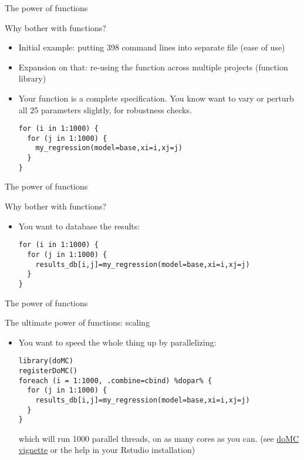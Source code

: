 \documentclass[xcolor=table,compress]{beamer}
\begin{document}
\begin{frame}[fragile]{The power of functions}
\begin{block}{Why bother with functions?}
\begin{itemize}
\item Initial example: putting 398 command lines into separate file (ease of use)
\item Expansion on that: re-using the function across multiple projects (function library)
\item Your function is a complete specification. You know want to vary or perturb all 25 parameters slightly, for robustness checks.
\begin{lstlisting}
for (i in 1:1000) {
  for (j in 1:1000) {
  	my_regression(model=base,xi=i,xj=j)
  }
}
\end{lstlisting}
\end{itemize}
\end{block}
\end{frame}




\begin{frame}[fragile]{The power of functions}
\begin{block}{Why bother with functions?}
\begin{itemize}
\item You want to database the results:
\begin{lstlisting}
for (i in 1:1000) {
  for (j in 1:1000) {
  	results_db[i,j]=my_regression(model=base,xi=i,xj=j)
  }
}
\end{lstlisting}
\end{itemize}
\end{block}
\end{frame}




\begin{frame}[fragile]{The power of functions}
\begin{block}{The ultimate power of functions: scaling}
\begin{itemize}
\item You want to speed the whole thing up by parallelizing:
\begin{lstlisting}
library(doMC)
registerDoMC()
foreach (i = 1:1000, .combine=cbind) %dopar% {
  for (j in 1:1000) {
  	results_db[i,j]=my_regression(model=base,xi=i,xj=j)
  }
}
\end{lstlisting}
which will run 1000 parallel threads, on as many cores as you can.
(see \href{http://cran.r-project.org/web/packages/doMC/vignettes/gettingstartedMC.pdf}{doMC vignette} or the help in your Rstudio installation)
\end{itemize}
\end{block}
\end{frame}
\end{document}
